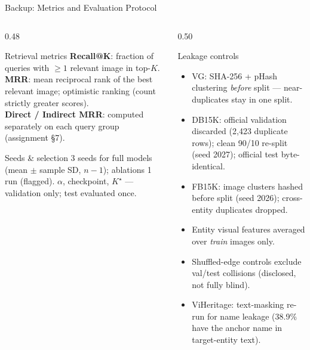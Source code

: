 \documentclass[aspectratio=169,10pt]{beamer}
\begin{document}
\begin{frame}[noframenumbering]{Backup: Metrics and Evaluation Protocol}
  \begin{columns}[t]
    \begin{column}{0.48\textwidth}
      \begin{block}{Retrieval metrics}\footnotesize
        \textbf{Recall@K}: fraction of queries with $\ge 1$ relevant image in top-$K$.\\[0.1cm]
        \textbf{MRR}: mean reciprocal rank of the best relevant image; optimistic ranking (count strictly greater scores).\\[0.1cm]
        \textbf{Direct / Indirect MRR}: computed separately on each query group (assignment \S 7).
      \end{block}
      \vspace{0.15cm}
      \begin{block}{Seeds \& selection}\footnotesize
        3 seeds for full models (mean $\pm$ sample SD, $n{-}1$); ablations 1 run (flagged). $\alpha$, checkpoint, $K^\star$ --- validation only; test evaluated once.
      \end{block}
    \end{column}
    \begin{column}{0.50\textwidth}
      \begin{block}{Leakage controls}\footnotesize
        \begin{itemize}
          \item VG: SHA-256 + pHash clustering \emph{before} split --- near-duplicates stay in one split.
          \item DB15K: official validation discarded (2{,}423 duplicate rows); clean 90/10 re-split (seed 2027); official test byte-identical.
          \item FB15K: image clusters hashed before split (seed 2026); cross-entity duplicates dropped.
          \item Entity visual features averaged over \emph{train} images only.
          \item Shuffled-edge controls exclude val/test collisions (disclosed, not fully blind).
          \item ViHeritage: text-masking re-run for name leakage (38.9\% have the anchor name in target-entity text).
        \end{itemize}
      \end{block}
    \end{column}
  \end{columns}
\end{frame}
\end{document}
